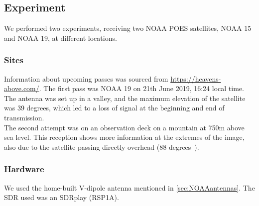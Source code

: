 \documentclass[conference]{IEEEtran}
\begin{document}
\subsection{Experiment}
We performed two experiments, receiving two NOAA POES satellites, NOAA 15 and NOAA 19, at different locations.
\subsubsection{Sites}
Information about upcoming passes was sourced from \url{https://heavens-above.com/}. The first pass was NOAA 19 on 21th June 2019, 16:24 local time. The antenna was set up in a valley, and the maximum elevation of the satellite was 39 degrees, which led to a loss of signal at the beginning and end of transmission.\\
The second attempt was on an observation deck on a mountain at 750m above sea level. This reception shows more information at the extremes of the image, also due to the satellite passing directly overhead (88 degrees~\cite{heavensabove19noaa15}).\\
\subsubsection{Hardware}
We used the home-built V-dipole antenna mentioned in \ref{sec:NOAAantennas}. The SDR used was an SDRplay (RSP1A). 
\end{document}
